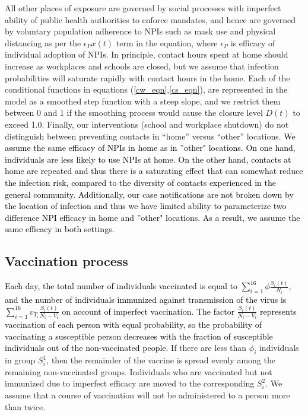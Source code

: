 All other places of exposure are governed by social processes with imperfect ability of public health authorities to enforce mandates, and hence are governed by voluntary population adherence to NPIs such as mask use and physical distancing as per the $\epsilon_P x(t)$ term in the equation, where $\epsilon_P$ is efficacy of individual adoption of NPIs.  In principle, contact hours spent at home should increase as workplaces and schools are closed, but we assume that infection probabilities will saturate rapidly with contact hours in the home. Each of the conditional functions in equations (\ref{cw_eqn},\ref{cs_eqn}), are represented in the model as a smoothed step function with a steep slope, and we restrict them between $0$ and $1$ if the smoothing process would cause the closure level $D(t)$ to exceed 1.0.   Finally, our interventions (school and workplace shutdown) do not distinguish between preventing contacts in “home” versus “other” locations. \textcolor{black}{We assume the same efficacy of NPIs in home as in ''other" locations.  On one hand, individuals are less likely to use NPIs at home.  On the other hand, contacts at home are repeated and thus there is a saturating effect that can somewhat reduce the infection risk, compared to the diversity of contacts experienced in the general community.  Additionally, our case notifications are not broken down by the location of infection and thus we have limited ability to parameterize two difference NPI efficacy in home and ''other" locations.  As a result, we assume the same efficacy in both settings.}

\subsection{Vaccination process}
 \textcolor{black}{Each day, the total number of individuals vaccinated is equal to $\sum_{i = 1}^{16} \phi \frac{S_i(t)}{N_i}$, and the number of individuals immunized against transmission of the virus is $\sum_{i = 1}^{16} v_{T_i} \frac{S_i(t)}{N_i - V_i}$ on account of imperfect vaccination. The factor $\frac{S_i(t)}{N_i - V_i}$ represents vaccination of each person with equal probability, so the probability of vaccinating a susceptible person decreases with the fraction of susceptible individuals out of the non-vaccinated people.} If there are less than $\phi_i$ individuals in group $S^1_i$, then the remainder of the vaccine is spread evenly among the remaining non-vaccinated groups. Individuals who are vaccinated but not immunized due to imperfect efficacy are moved to the corresponding $S^2_i$. We assume that a course of vaccination will not be administered to a person more than twice.

